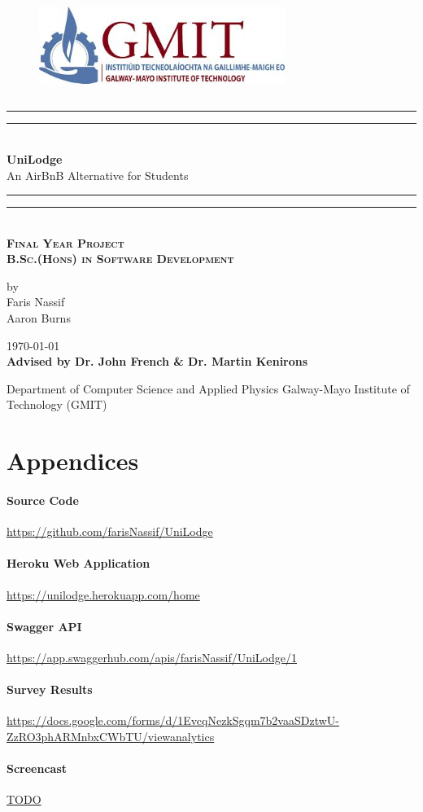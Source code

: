 \documentclass[10pt]{report}
\newcommand*{\customTitle}{\begingroup %
\centering %
\vspace*{\baselineskip} %

\rule{\textwidth}{1.6pt}\vspace*{-\baselineskip}\vspace*{2pt} %
\rule{\textwidth}{0.4pt}\\[\baselineskip] %

{\Large \textbf{UniLodge}  \\[2ex] An AirBnB Alternative for Students}\\[0.2\baselineskip] %


\rule{\textwidth}{0.4pt}\vspace*{-\baselineskip}\vspace{3.2pt} %
\rule{\textwidth}{1.6pt}\\[\baselineskip] %
\scshape %
\Large \textbf{Final Year Project}\\
\textbf{B.Sc.(Hons) in Software Development}\par %
\normalsize
\vspace*{2\baselineskip} %


{by \\ Faris Nassif \\ Aaron Burns \par} %


\vspace*{2\baselineskip} %
\vfill %
{\scshape \today} \\[0.3\baselineskip] %


{\textbf{Advised by Dr. John French \& Dr. Martin Kenirons}}\par %

{Department of Computer Science and Applied Physics Galway-Mayo Institute of Technology (GMIT)}\par %


\endgroup}
\begin{document}
 
\begin{figure}
\begin{center}
\includegraphics[width=8cm,height=3.3cm,keepaspectratio]{images/gmit-logo.jpg} %
\end{center}
\end{figure}
\customTitle %
\tableofcontents
\listoffigures
{} 














\appendix
\chapter*{Appendices}
\renewcommand{\thesection}{A.\arabic{section}}

\subsubsection{Source Code}
\url{https://github.com/farisNassif/UniLodge}

\subsubsection{Heroku Web Application}
\url{https://unilodge.herokuapp.com/home}

\subsubsection{Swagger API}
\url{https://app.swaggerhub.com/apis/farisNassif/UniLodge/1}

\subsubsection{Survey Results}
\url{https://docs.google.com/forms/d/1EvcqNezkSgqm7b2vaaSDztwU-ZzRO3phARMnbxCWbTU/viewanalytics}

\subsubsection{Screencast}
\url{TODO}
\end{document}
